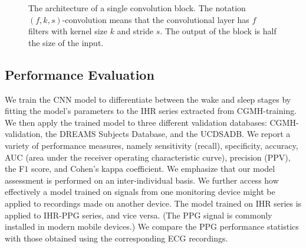 \documentclass[10pt,a4paper,english]{amsart}
\begin{document}
\begin{figure}
\centering
    \caption{\label{Fig:ConvBlock}The architecture of a single convolution block.  The notation $(f, k, s)$-convolution means that the convolutional layer has $f$ filters with kernel size $k$ and stride $s$.  The output of the block is half the size of the input.}
\end{figure}

\subsection{Performance Evaluation}

We train the CNN model to differentiate between the wake and sleep stages by fitting the model's parameters to the IHR series extracted from CGMH-training. We then apply the trained model to three different validation databases: CGMH-validation, the DREAMS Subjects Database, and the UCDSADB. We report a variety of performance measures, namely sensitivity (recall), specificity, accuracy, AUC (area under the receiver operating characteristic curve), precision (PPV),  the F$1$ score, and Cohen's kappa coefficient.  We emphasize that our model assessment is performed on an inter-individual basis. 
We further access how effectively a model trained on signals from one monitoring device might be applied to recordings made on another device. The model trained on IHR series is applied to IHR-PPG series, and vice versa. (The PPG signal is commonly installed in modern mobile devices.) We compare the PPG performance statistics with those obtained using the corresponding ECG recordings.  
\end{document}
